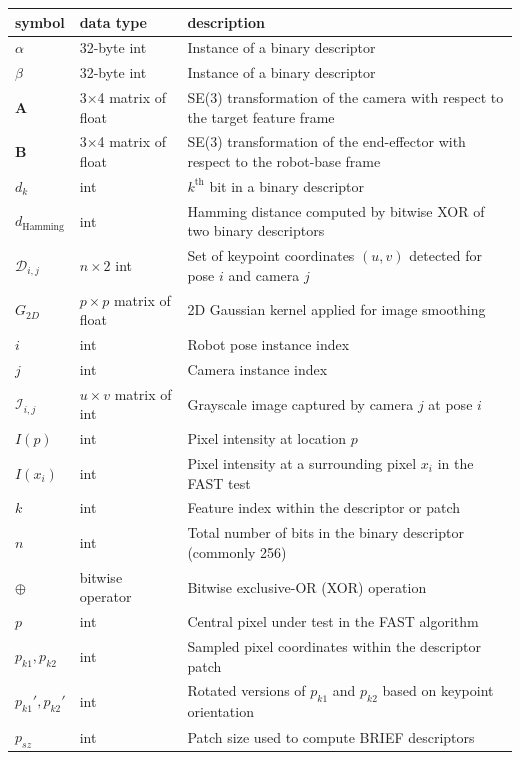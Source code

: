 \documentclass[12pt]{article}
\begin{document}
\renewcommand{\arraystretch}{1.2}
\noindent
\begin{longtable*}{l l p{12cm}} 
\toprule
\textbf{symbol} & \textbf{data type} & \textbf{description} \\
\midrule 
$\alpha$ & 32-byte int & Instance of a binary descriptor \\
$\beta$ & 32-byte int & Instance of a binary descriptor \\
$\textbf{A}$ & 3$\times$4 matrix of float & SE(3) transformation of the camera with respect to the target feature frame \\
$\textbf{B}$ & 3$\times$4 matrix of float & SE(3) transformation of the end-effector with respect to the robot-base frame \\
$d_{k}$ & int & $k^\text{th}$ bit in a binary descriptor \\
$d_{\text{Hamming}}$ & int & Hamming distance computed by bitwise XOR of two binary descriptors \\
$\mathcal{D}_{i,j}$ & $n \times 2$ int & Set of keypoint coordinates $(u,v)$ detected for pose $i$ and camera $j$ \\
$G_{2D}$ & $p \times p$ matrix of float & 2D Gaussian kernel applied for image smoothing \\
$i$ & int & Robot pose instance index \\
$j$ & int & Camera instance index \\
$\mathcal{I}_{i,j}$ & $u \times v$ matrix of int & Grayscale image captured by camera $j$ at pose $i$ \\
$I(p)$ & int & Pixel intensity at location $p$ \\
$I(x_i)$ & int & Pixel intensity at a surrounding pixel $x_i$ in the FAST test \\
$k$ & int & Feature index within the descriptor or patch \\
$n$ & int & Total number of bits in the binary descriptor (commonly 256) \\
$\oplus$ & bitwise operator & Bitwise exclusive-OR (XOR) operation \\
$p$ & int & Central pixel under test in the FAST algorithm \\
$p_{k1}, p_{k2}$ & int & Sampled pixel coordinates within the descriptor patch \\
$p_{k1}', p_{k2}'$ & int & Rotated versions of $p_{k1}$ and $p_{k2}$ based on keypoint orientation \\
$p_{sz}$ & int & Patch size used to compute BRIEF descriptors \\

\end{longtable*}
\end{document}
